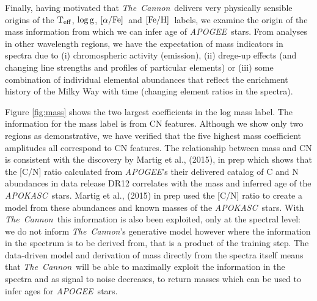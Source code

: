 \documentclass[12pt, preprint]{aastex}
\newcommand{\project}[1]{\textsl{#1}}
\newcommand{\tc}{\project{The~Cannon}}
\newcommand{\apogee}{\project{APOGEE}}
\newcommand{\apokasc}{\project{APOKASC}}
\newcommand{\teff}{\mbox{$\rm T_{eff}$}}
\newcommand{\feh}{\mbox{$\rm [Fe/H]$}}
\newcommand{\alphafe}{\mbox{$\rm [\alpha/Fe]$}}
\newcommand{\logg}{\mbox{$\rm \log g$}}
\begin{document}
Finally, having motivated that \tc\ delivers very physically sensible origins of the \teff, \logg, \alphafe\ and \feh\ labels, we examine the origin of the mass information from which we can infer age of \apogee\ stars. From analyses in other wavelength regions, we have the expectation of mass indicators in spectra due to (i) chromospheric activity (emission), (ii) drege-up effects (and changing line strengths and profiles of particular elements) or (iii) some combination of individual elemental abundances that reflect the enrichment history of the Milky Way with time (changing element ratios in the spectra). 

Figure \ref{fig:mass} shows the two largest coefficients in the log mass label. The information for the mass label is from CN features. Although we show only two regions as demonstrative, we have verified that the five highest mass coefficient amplitudes all correspond to CN features. The relationship between mass and CN is consistent with the discovery by Martig et al., (2015), in prep which shows that the [C/N] ratio calculated from \apogee's their delivered catalog of C and N abundances in data release DR12 correlates with the mass and inferred age of the \apokasc\ stars. Martig et al., (2015) in prep used the [C/N] ratio to create a model from these abundances and known masses of the \apokasc\ stars. With \tc\, this information is also been exploited, only at the spectral level: we do not inform \tc's generative model however where the information in the spectrum is to be derived from, that is a product of the training step. The data-driven model and derivation of mass directly from the spectra itself means that \tc\ will be able to maximally exploit the information in the spectra and as signal to noise decreases, to return masses which can be used to infer ages for \apogee\ stars.  
\end{document}
